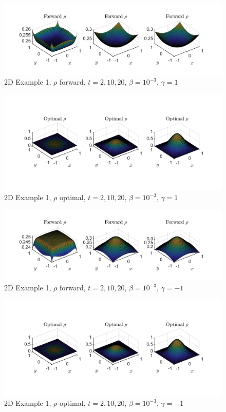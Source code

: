 \documentclass[11pt, a4paper]{article}
\theoremstyle{definition}
\begin{document}
	\begin{figure}[h]
		\includegraphics[scale=0.25]{FWrho2Dg1.jpg}
		\caption{2D Example 1, $\rho$ forward, $t= 2,10,20$, $\beta = 10^{-3}$, $\gamma = 1$}
		\label{Fig2D1}
	\end{figure}
	\begin{figure}[h]
		\includegraphics[scale=0.25]{Optrho2Dg1.jpg}
		\caption{2D Example 1, $\rho$ optimal, $t= 2,10,20$, $\beta = 10^{-3}$, $\gamma = 1$}
		\label{Fig2D2}
	\end{figure}
	\begin{figure}[h]
		\includegraphics[scale=0.25]{FWrho2Dgn1.jpg}
		\caption{2D Example 1, $\rho$ forward, $t= 2,10,20$, $\beta = 10^{-3}$, $\gamma = -1$}
		\label{Fig2D4}
	\end{figure}
	\begin{figure}[h]
		\includegraphics[scale=0.25]{Optrho2Dgn1.jpg}
		\caption{2D Example 1, $\rho$ optimal, $t= 2,10,20$, $\beta = 10^{-3}$, $\gamma = -1$}
		\label{Fig2D5}
	\end{figure}
	
	
\end{document}
